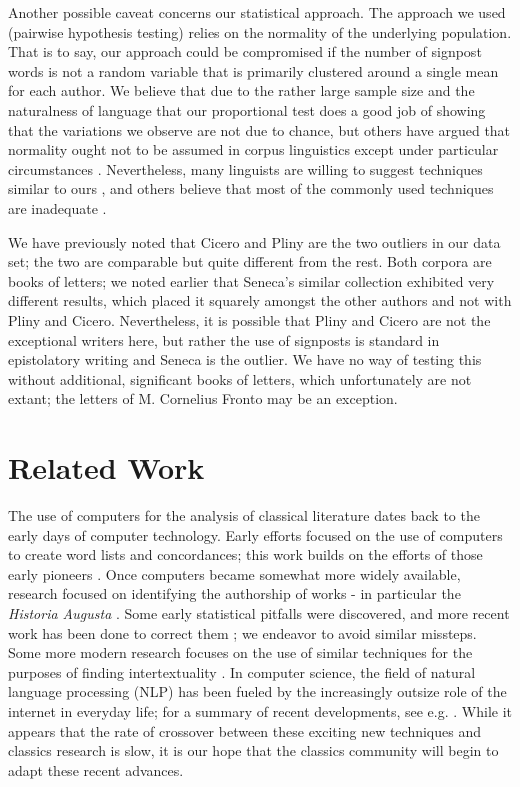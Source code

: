 Another possible caveat concerns our statistical approach. The approach we used (pairwise hypothesis testing) relies on the normality of the underlying population. That is to say, our approach could be compromised if the number of signpost words is not a random variable that is primarily clustered around a single mean for each author. We believe that due to the rather large sample size and the naturalness of language that our proportional test does a good job of showing that the variations we observe are not due to chance, but others have argued that normality ought not to be assumed in corpus linguistics except under particular circumstances \cite{chi2}. Nevertheless, many linguists are willing to suggest techniques similar to ours \cite{gries}, and others believe that most of the commonly used techniques are inadequate \cite{bestgen}.

We have previously noted that Cicero and Pliny are the two outliers in our data set; the two are comparable but quite different from the rest. Both corpora are books of letters; we noted earlier that Seneca's similar collection exhibited very different results, which placed it squarely amongst the other authors and not with Pliny and Cicero. Nevertheless, it is possible that Pliny and Cicero are not the exceptional writers here, but rather the use of signposts is standard in epistolatory writing and Seneca is the outlier. We have no way of testing this without additional, significant books of letters, which unfortunately are not extant; the letters of M. Cornelius Fronto may be an exception.

\section{Related Work}
\label{sec:related}

The use of computers for the analysis of classical literature dates back to the early days of computer technology. Early efforts focused on the use of computers to create word lists and concordances; this work builds on the efforts of those early pioneers \cite{early}. Once computers became somewhat more widely available, research focused on identifying the authorship of works - in particular the \textit{Historia Augusta} \cite{marriott}. Some early statistical pitfalls were discovered, and more recent work has been done to correct them \cite{sansone} \cite{purple}; we endeavor to avoid similar missteps. Some more modern research focuses on the use of similar techniques for the purposes of finding intertextuality \cite{forstall}. In computer science, the field of natural language processing (NLP) has been fueled by the increasingly outsize role of the internet in everyday life; for a summary of recent developments, see e.g. \cite{nlp}. While it appears that the rate of crossover between these exciting new techniques and classics research is slow, it is our hope that the classics community will begin to adapt these recent advances.


